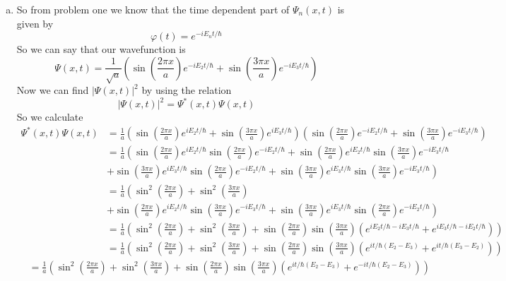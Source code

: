 \documentclass[11pt]{article}
\numberwithin{equation}{section}
\begin{document}
\begin{enumerate}[(a)]
\item
So from problem one we know that the time dependent part of $\Psi_n(x,t)$ is given by
$$\varphi(t) = e^{-iE_nt/\hbar}$$
So we can say that our wavefunction is
$$\Psi(x,t) = \frac{1}{\sqrt{a}}\left(\sin\left(\frac{2\pi x}{a}\right)e^{-iE_2t/\hbar} + \sin\left(\frac{3\pi x}{a}\right)e^{-iE_3t/\hbar}\right)$$
Now we can find $|\Psi(x,t)|^2$ by using the relation 
\begin{equation}
|\Psi(x,t)|^2 = \Psi^*(x,t)\Psi(x,t)
\end{equation}
So we calculate
\begin{align*}
\Psi^*(x,t)\Psi(x,t) &= \frac{1}{a}\left(\sin\left(\frac{2\pi x}{a}\right)e^{iE_2t/\hbar} + \sin\left(\frac{3\pi x}{a}\right)e^{iE_3t/\hbar}\right)\left(\sin\left(\frac{2\pi x}{a}\right)e^{-iE_2t/\hbar} + \sin\left(\frac{3\pi x}{a}\right)e^{-iE_3t/\hbar}\right)\\
&= \frac{1}{a}\left(\sin\left(\frac{2\pi x}{a}\right)e^{iE_2t/\hbar}\sin\left(\frac{2\pi x}{a}\right)e^{-iE_2t/\hbar} + \sin\left(\frac{2\pi x}{a}\right)e^{iE_2t/\hbar}\sin\left(\frac{3\pi x}{a}\right)e^{-iE_3t/\hbar} \right.\\
&\left.+ \sin\left(\frac{3\pi x}{a}\right)e^{iE_3t/\hbar}\sin\left(\frac{2\pi x}{a}\right)e^{-iE_2t/\hbar} + \sin\left(\frac{3\pi x}{a}\right)e^{iE_3t/\hbar}\sin\left(\frac{3\pi x}{a}\right)e^{-iE_3t/\hbar}\right)\\
&= \frac{1}{a}\left(\sin^2\left(\frac{2\pi x}{a}\right) + \sin^2\left(\frac{3\pi x}{a}\right) \right.\\
&\left.+\sin\left(\frac{2\pi x}{a}\right)e^{iE_2t/\hbar}\sin\left(\frac{3\pi x}{a}\right)e^{-iE_3t/\hbar} + \sin\left(\frac{3\pi x}{a}\right)e^{iE_3t/\hbar}\sin\left(\frac{2\pi x}{a}\right)e^{-iE_2t/\hbar}\right)\\
&= \frac{1}{a}\left(\sin^2\left(\frac{2\pi x}{a}\right) + \sin^2\left(\frac{3\pi x}{a}\right) + \sin\left(\frac{2\pi x}{a}\right)\sin\left(\frac{3\pi x}{a}\right)\left(e^{iE_2t/\hbar-iE_3t/\hbar} + e^{iE_3t/\hbar-iE_2t/\hbar}\right)\right)\\
&= \frac{1}{a}\left(\sin^2\left(\frac{2\pi x}{a}\right) + \sin^2\left(\frac{3\pi x}{a}\right) + \sin\left(\frac{2\pi x}{a}\right)\sin\left(\frac{3\pi x}{a}\right)\left(e^{it/\hbar(E_2-E_3)} + e^{it/\hbar(E_3-E_2)}\right)\right)
\end{align*}
\begin{align*}
&= \frac{1}{a}\left(\sin^2\left(\frac{2\pi x}{a}\right) + \sin^2\left(\frac{3\pi x}{a}\right) + \sin\left(\frac{2\pi x}{a}\right)\sin\left(\frac{3\pi x}{a}\right)\left(e^{it/\hbar(E_2-E_3)} + e^{-it/\hbar(E_2-E_3)}\right)\right)\\

\end{align*}
\end{enumerate}
\end{document}
